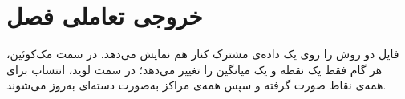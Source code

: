 \section{خروجی تعاملی فصل}

فایل  دو روش را روی یک داده‌ی مشترک
کنار هم نمایش می‌دهد. در سمت مک‌کوئین، هر گام فقط یک نقطه و یک میانگین را تغییر می‌دهد؛ در سمت لوید، انتساب برای همه‌ی نقاط صورت گرفته و سپس همه‌ی مراکز
به‌صورت دسته‌ای به‌روز می‌شوند.